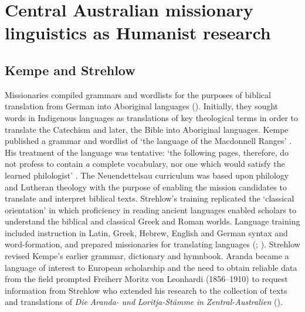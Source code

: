 \documentclass[output=paper]{langsci/langscibook}
\begin{document}
\section{Central Australian missionary linguistics as Humanist research}

\subsection{Kempe and Strehlow}

Missionaries compiled grammars and wordlists for the purposes of biblical translation from German into Aboriginal languages (\citealt{harding_indigenous_2018}). Initially, they sought words in Indigenous languages as translations of key theological terms in order to translate the Catechism and later, the Bible into Aboriginal languages. Kempe published a grammar and wordlist of ‘the language of the Macdonnell Ranges’ \citep{kempe_grammar_1891}. His treatment of the language was tentative: ‘the following pages, therefore, do not profess to contain \textit{a} complete vocabulary, nor one which would satisfy the learned philologist’ \citep[1]{kempe_grammar_1891}. The Neuendettelsau curriculum was based upon philology and Lutheran theology with the purpose of enabling the mission candidates to translate and interpret biblical texts. Strehlow’s training replicated the ‘classical orientation’ \citep[83]{kenny_arandas_2013} in which proficiency in reading ancient languages enabled scholars to understand the biblical and classical Greek and Roman worlds. Language training included instruction in Latin, Greek, Hebrew, English and German syntax and word-formation, and prepared missionaries for translating languages (\citealt[8]{wendt_missionare_2001}; \citealt[26]{nobbs_bush_2005}). Strehlow revised Kempe’s earlier grammar, dictionary and hymnbook. Aranda became a language of interest to European scholarship and the need to obtain reliable data from the field prompted Freiherr Moritz von Leonhardi (1856--1910) to request information from Strehlow who extended his research to the collection of texts and translations of \textit{Die} \textit{Aranda-} \textit{und} \textit{Loritja-Stämme} \textit{in} \textit{Zentral-Australien} (\citealt{strehlow_aranda-und_1907}). 
\end{document}
